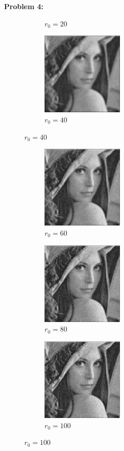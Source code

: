 \documentclass[11pt]{article}
\newenvironment{problem}[1]{\textbf{Problem #1: }}{\newpage}
\begin{document}
\begin{problem}{4}
\begin{enumerate}[label = (\alph*)]
\begin{figure}[h!]
\begin{subfigure}{.3 \textwidth}
					\caption{$r_0 = 20$}
				\end{subfigure}
				\begin{subfigure}{.3 \textwidth}
					\centering
					\includegraphics[height = 4cm]{Figures/Prob4/r040}
					\caption{$r_0 = 40$}
				\end{subfigure}
			\end{figure}
			\begin{figure}[h!]
				\centering
				\begin{subfigure}{.3 \textwidth}
					\centering
					\includegraphics[height = 4cm]{Figures/Prob4/r060}
					\caption{$r_0 = 60$}
				\end{subfigure}
				\begin{subfigure}{.3 \textwidth}
					\centering
					\includegraphics[height = 4cm]{Figures/Prob4/r080}
					\caption{$r_0 = 80$}
				\end{subfigure}
				\begin{subfigure}{.3 \textwidth}
					\centering
					\includegraphics[height = 4cm]{Figures/Prob4/r0100}
					\caption{$r_0 = 100$}
				\end{subfigure}
			\end{figure}
		\end{enumerate}
	\end{problem}
\end{document}
